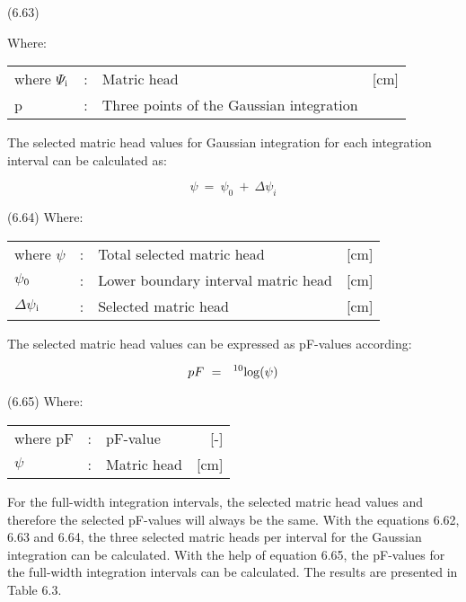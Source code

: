  
\strut\hfill (6.63)




Where:\\
\begin{tabularx}{\textwidth}{llXr}



where $\Psi$$_{{\rm i}}$ &:& Matric head  & [cm]\\
p &:& Three points of the Gaussian integration
\end{tabularx}



The selected matric head values for Gaussian integration for each integration interval can
be calculated as:

\begin{equation}
\psi ~=~ \psi _{0} ~+~\Delta \psi _{i} 
\end{equation}

 
\strut\hfill (6.64)
Where:\\
\begin{tabularx}{\textwidth}{llXr}



where $\psi$ &:& Total selected matric head  & [cm]\\
$\psi$$_{{\rm 0}}$ &:& Lower boundary interval matric head  & [cm]\\
$\Delta$$\psi$$_{{\rm i}}$ &:& Selected matric head  & [cm]
\end{tabularx}



The selected matric head values can be expressed as pF-values according:

\begin{equation}
pF ~=~\ ^{10} {\rm log} (\psi )
\end{equation}

 
\strut\hfill (6.65)
Where:\\
\begin{tabularx}{\textwidth}{llXr}



where pF &:& pF-value  & [-]\\
$\psi$ &:& Matric head  & [cm]
\end{tabularx}






 For the full-width integration intervals, the selected matric head values and therefore the
selected pF-values will always be the same. With the equations 6.62,  6.63 and 6.64, the
three selected matric heads per interval for the Gaussian integration can be calculated.
With the help of equation 6.65, the pF-values for the full-width integration intervals can
be calculated. The results are presented in Table 6.3.


